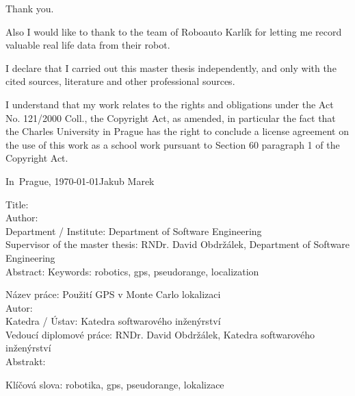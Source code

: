 

\vspace{10mm} 

Thank you.

Also I would like to thank to the team of Roboauto Karlík for letting me
record valuable real life data from their robot.

\cleartorecto

\vspace*{\fill}
I declare that I carried out this master thesis independently, and only with the cited
sources, literature and other professional sources.

I understand that my work relates to the rights and obligations under the Act No.
121/2000 Coll., the Copyright Act, as amended, in particular the fact that the Charles
University in Prague has the right to conclude a license agreement on the use of this
work as a school work pursuant to Section 60 paragraph 1 of the Copyright Act.

\vspace{10mm} 
\noindent In~Prague, \today\hspace{\fill}Jakub Marek\\
\cleartorecto

\tableofcontents*
\cleartorecto

\noindent
Title: \thetitle\\
Author: \theauthor\\
Department / Institute: Department of Software Engineering\\
Supervisor of the master thesis: RNDr. David Obdržálek, Department of Software Engineering\\

\noindent Abstract: 
\noindent Keywords: robotics, gps, pseudorange, localization

\vspace{25mm}

\noindent
Název práce: Použití GPS v Monte Carlo lokalizaci\\
Autor: \theauthor\\
Katedra / Ústav: Katedra softwarového inženýrství\\
Vedoucí diplomové práce: RNDr. David Obdržálek, Katedra softwarového inženýrství\\

\noindent Abstrakt: 

\noindent Klíčová slova: robotika, gps, pseudorange, lokalizace

\cleartorecto


